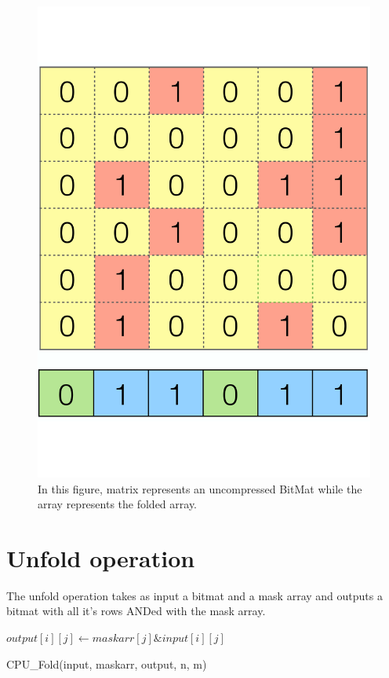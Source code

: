 \documentclass{article}
\begin{document}
\begin{figure}[h]
        \includegraphics[width=.5\textwidth]{OR.pdf}
        \caption{In this figure, matrix represents an uncompressed BitMat while the array represents the folded array. }
        \centering
\end{figure}

\section*{Unfold operation}
The unfold operation takes as input a bitmat and a mask array and outputs a bitmat with all it's rows ANDed with the mask array.

\begin{algorithm}[H]
      \begin{algorithmic}[1]
                \STATE $output[i][j] \gets maskarr[j] \& input[i][j]$
            \ENDFOR
        \ENDFOR
      \end{algorithmic}
      \caption{CPU\_Fold(input, maskarr, output, n, m)}
\end{algorithm}
\end{document}
